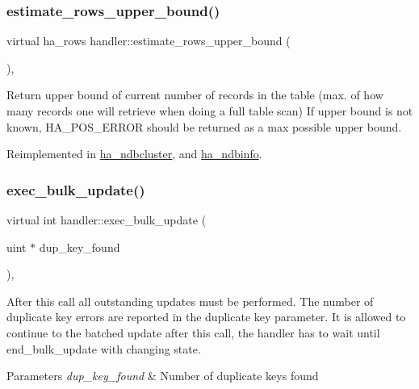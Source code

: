 \subsubsection{\texorpdfstring{estimate\+\_\+rows\+\_\+upper\+\_\+bound()}{estimate\_rows\_upper\_bound()}}
{\footnotesize\ttfamily virtual ha\+\_\+rows handler\+::estimate\+\_\+rows\+\_\+upper\+\_\+bound (\begin{DoxyParamCaption}{ }\end{DoxyParamCaption})\hspace{0.3cm}{\ttfamily [inline]}, {\ttfamily [virtual]}}

Return upper bound of current number of records in the table (max. of how many records one will retrieve when doing a full table scan) If upper bound is not known, H\+A\+\_\+\+P\+O\+S\+\_\+\+E\+R\+R\+OR should be returned as a max possible upper bound. 

Reimplemented in \mbox{\hyperlink{classha__ndbcluster_a59555b02c52fc703e99a41d3ee3a04c3}{ha\+\_\+ndbcluster}}, and \mbox{\hyperlink{classha__ndbinfo_a343b6837bb14a74236095276dec644dd}{ha\+\_\+ndbinfo}}.

\mbox{\label{classhandler_a886bf2fbf16de7e200e3ebc0765fb6e4}} 
\subsubsection{\texorpdfstring{exec\+\_\+bulk\+\_\+update()}{exec\_bulk\_update()}}
{\footnotesize\ttfamily virtual int handler\+::exec\+\_\+bulk\+\_\+update (\begin{DoxyParamCaption}\item[{uint $\ast$}]{dup\+\_\+key\+\_\+found }\end{DoxyParamCaption})\hspace{0.3cm}{\ttfamily [inline]}, {\ttfamily [virtual]}}

After this call all outstanding updates must be performed. The number of duplicate key errors are reported in the duplicate key parameter. It is allowed to continue to the batched update after this call, the handler has to wait until end\+\_\+bulk\+\_\+update with changing state.


\begin{DoxyParams}{Parameters}
{\em dup\+\_\+key\+\_\+found} & Number of duplicate keys found\\
\hline
\end{DoxyParams}

